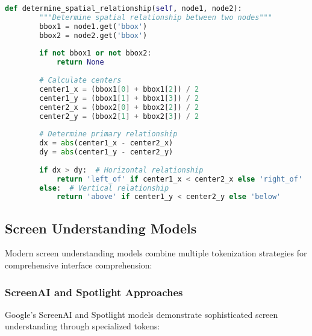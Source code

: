 \begin{lstlisting}[language=Python, caption=Hierarchical interface tokenization]
    def determine_spatial_relationship(self, node1, node2):
        """Determine spatial relationship between two nodes"""
        bbox1 = node1.get('bbox')
        bbox2 = node2.get('bbox')
        
        if not bbox1 or not bbox2:
            return None
        
        # Calculate centers
        center1_x = (bbox1[0] + bbox1[2]) / 2
        center1_y = (bbox1[1] + bbox1[3]) / 2
        center2_x = (bbox2[0] + bbox2[2]) / 2
        center2_y = (bbox2[1] + bbox2[3]) / 2
        
        # Determine primary relationship
        dx = abs(center1_x - center2_x)
        dy = abs(center1_y - center2_y)
        
        if dx > dy:  # Horizontal relationship
            return 'left_of' if center1_x < center2_x else 'right_of'
        else:  # Vertical relationship
            return 'above' if center1_y < center2_y else 'below'
\end{lstlisting}

\subsection{Screen Understanding Models}

Modern screen understanding models combine multiple tokenization strategies for comprehensive interface comprehension:

\subsubsection{ScreenAI and Spotlight Approaches}

Google's ScreenAI and Spotlight models demonstrate sophisticated screen understanding through specialized tokens:


